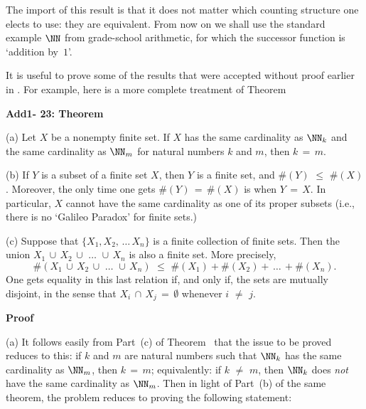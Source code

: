         The import of this result is that it does not matter which counting structure one elects to use: they are equivalent.
    From now on we shall use the standard example ${\NN}$ from grade-school arithmetic, for which the successor function is `addition by~$1$'.

\V
\V

        It is useful to prove some of the results that were accepted without proof earlier in {\TheseNotes}.
    For example, here is a more complete treatment of Theorem~


        {\bf Add1- 23: Theorem}

\hspace*{\parindent}(a) Let $X$ be a nonempty finite set. If $X$ has the same cardinality as ${\NN}_{k}$ and the same cardinality as ${\NN}_{m}$ for natural numbers $k$ and $m$, then $k \,=\, m$.

\V

        (b) If $Y$ is a subset of a finite set $X$, then $Y$ is a finite set, and $\#(Y)\,\,{\leq}\,\,\#(X)$.
    Moreover, the only time one gets $\#(Y) \,=\, \#(X)$ is when $Y \,=\, X$.
    In particular, $X$ cannot have the same cardinality as one of its proper subsets (i.e., there is no `Galileo Paradox' for finite sets.)


\V

        (c) Suppose that $\{X_{1},X_{2},\,{\ldots}\,X_{n}\}$ is a finite collection of finite sets.
    Then the union $X_{1}\,{\cup}\,X_{2}\,{\cup}\,\,{\ldots}\,\,{\cup}\,X_{n}$ is also a finite set. More precisely,
        \begin{displaymath}
         \#(X_{1}\,{\cup}\,X_{2}\,{\cup}\,\,{\ldots}\,\,{\cup}\,X_{n})
    \,\,{\leq}\,\,
        \#(X_{1}) + \#(X_{2}) + \,{\ldots}\,+\#(X_{n}).
        \end{displaymath}
    One gets equality in this last relation if, and only if, the sets are mutually disjoint,
    in the sense that $X_{i}\,{\cap}\,X_{j} \,=\, {\emptyset}$ whenever $i \,\,{\neq}\,\, j$.

\V


        {\bf Proof}\, 

\V

        (a) It follows easily from Part~(c) of Theorem~ that the issue to be proved reduces to this:
    if $k$ and $m$ are natural numbers such that ${\NN}_{k}$ has the same cardinality as ${\NN}_{m}$, then $k \,=\, m$;
    equivalently: if $k \,\,{\neq}\,\, m$, then ${\NN}_{k}$ does {\em not} have the same cardinality as ${\NN}_{m}$.
    Then in light of Part~(b) of the same theorem, the problem reduces to proving the following statement:

